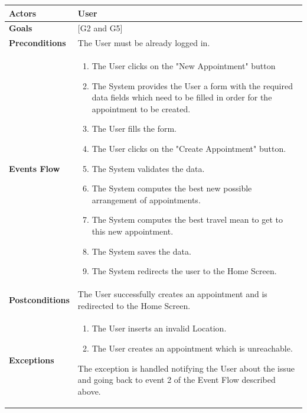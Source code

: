 \documentclass[12pt]{article}
\begin{document}
\begin{center}
    \begin{tabular} { |p{}|p{}| }
        \hline
        \textbf{Actors} & User \\ 
        \hline
        \textbf{Goals} & {[G2 and G5]} \\ 
        \hline  
        \textbf{Preconditions} & The User must be already logged in. \\ 
        \hline
        \textbf{Events Flow} & \begin{enumerate}[topsep=0pt] 
                            \setlength{\itemsep}{0.5pt}
                            \item The User clicks on the "New Appointment" button
                            \item The System provides the User a form with the required data fields which need to be filled in order for the appointment to be created.
                            \item The User fills the form.
                            \item The User clicks on the "Create Appointment" button.
                            \item The System validates the data.
                            \item The System computes the best new possible arrangement of appointments.
                            \item The System computes the best travel mean to get to this new appointment.
                            \item The System saves the data.
                            \item The System redirects the user to the Home Screen.
                            \end{enumerate} \\
        \hline
        \textbf{Postconditions} & The User successfully creates an appointment and is redirected to the Home Screen. \\
        \hline
        \textbf{Exceptions} & \begin{enumerate}[topsep=0pt] 
                            \setlength{\itemsep}{0.5pt}
                            \item The User inserts an invalid Location.
                            \item The User creates an appointment which is unreachable.
                            \end{enumerate} 
                            The exception is handled notifying the User about the issue and going back to event 2 of the Event Flow described above.\\ 
        \hline
    \end{tabular}
\end{center}
\end{document}
